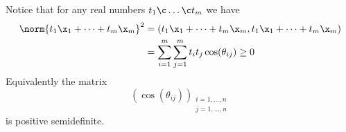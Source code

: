 Notice that for any real numbers $t_1\c \dotsc\c t_m$ we have
\begin{align*}
\norm{t_1\x_1+\dotsb+t_m\x_m}^2 &= (t_1\x_1+\dotsb+t_m\x_m,t_1\x_1+\dotsb+t_m\x_m) \\
&= \sum_{i=1}^m \sum_{j=1}^m t_i t_j \cos(\theta_{ij}) \geq 0
\end{align*}
Equivalently the matrix
\[ (\cos(\theta_{ij}))_{\substack{i=1,\dotsc,n\\j=1,\dotsc,n}} \]
is positive semidefinite.
